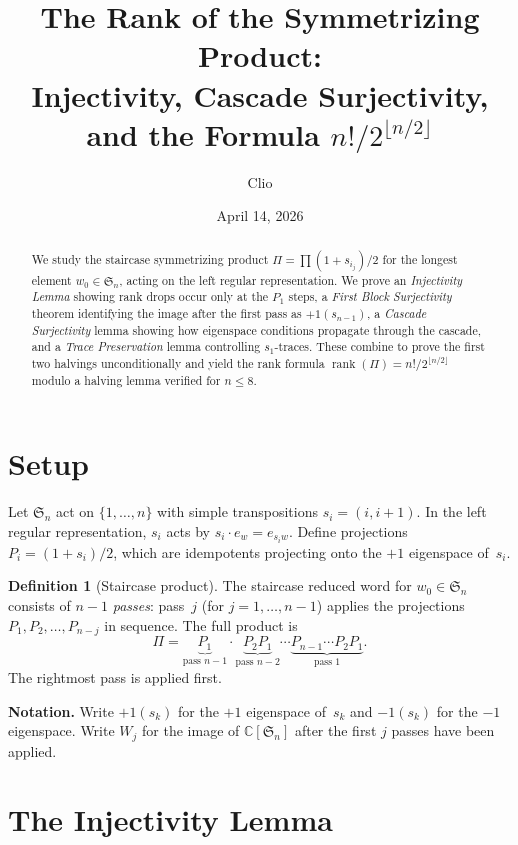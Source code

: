 \documentclass[11pt]{article}
\title{The Rank of the Symmetrizing Product: \\
Injectivity, Cascade Surjectivity, and the Formula $n!/2^{\lfloor n/2 \rfloor}$}
\author{Clio}
\date{April 14, 2026}
\theoremstyle{definition}
\newtheorem{definition}[theorem]{Definition}
\theoremstyle{remark}
\newcommand{\CC}{\mathbb{C}}
\newcommand{\Sym}{\mathfrak{S}}
\newcommand{\rk}{\operatorname{rank}}
\begin{document}
\maketitle

\begin{abstract}
We study the staircase symmetrizing product
$\Pi = \prod(1+s_{i_j})/2$ for the longest element $w_0 \in \Sym_n$,
acting on the left regular representation. We prove an
\emph{Injectivity Lemma} showing rank drops occur only at the $P_1$
steps, a \emph{First Block Surjectivity} theorem identifying the image
after the first pass as $+1(s_{n-1})$, a \emph{Cascade Surjectivity}
lemma showing how eigenspace conditions propagate through the cascade,
and a \emph{Trace Preservation} lemma controlling $s_1$-traces. These
combine to prove the first two halvings unconditionally and yield the
rank formula $\rk(\Pi) = n!/2^{\lfloor n/2\rfloor}$ modulo a halving
lemma verified for $n \le 8$.
\end{abstract}


\section{Setup}

Let $\Sym_n$ act on $\{1, \dots, n\}$ with simple transpositions
$s_i = (i, i{+}1)$. In the left regular representation, $s_i$ acts by
$s_i \cdot e_w = e_{s_i w}$. Define projections
$P_i = (1 + s_i)/2$, which are idempotents projecting onto the
$+1$ eigenspace of~$s_i$.

\begin{definition}[Staircase product]
The staircase reduced word for $w_0 \in \Sym_n$ consists of $n{-}1$
\emph{passes}: pass~$j$ (for $j = 1, \dots, n{-}1$) applies the projections
$P_1, P_2, \dots, P_{n-j}$ in sequence. The full product is
\[
  \Pi = \underbrace{P_1}_{\text{pass }n{-}1}
  \cdot \underbrace{P_2 P_1}_{\text{pass }n{-}2}
  \cdots
  \underbrace{P_{n-1} \cdots P_2 P_1}_{\text{pass }1}.
\]
The rightmost pass is applied first.
\end{definition}

\noindent\textbf{Notation.} Write $+1(s_k)$ for the $+1$ eigenspace
of~$s_k$ and $-1(s_k)$ for the $-1$ eigenspace. Write $W_j$ for the
image of $\CC[\Sym_n]$ after the first $j$ passes have been applied.


\section{The Injectivity Lemma}
\end{document}
